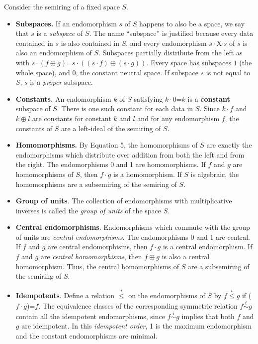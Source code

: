 \documentclass[11pt]{article}
\begin{document}
Consider the semiring of a fixed space $S$.  
\begin{itemize}

\item{{\bf Subspaces.} If an endomorphism $s$ of $S$ happens to also be a space, we say that $s$ is a {\it subspace} of $S$.  The name ``subspace'' is justified because every data contained in $s$ is also contained in $S$, and every endomorphism $s\cdot$X$\cdot s$ of $s$ is also an endomorphism of $S$.  
Subspaces partially distribute from the left as with $s\cdot(f\oplus g)$=$s\cdot((s\cdot f)\oplus(s\cdot g))$.
Every space has subspaces $1$ (the whole space), and $0$, the constant neutral space.  If subspace $s$ is not equal to $S$, $s$ is a {\it proper} subspace.} 

\item{{\bf Constants.}  An endomorphism $k$ of $S$ satisfying $k\cdot 0$=$k$ is a {\bf constant} subspace of $S$.  There is one such constant for each 
data in $S$.  Since $k\cdot f$ and $k\oplus l$ are constants for 
constant $k$ and $l$ and for any endomorphism $f$, the constants of $S$ are a left-ideal of the semiring of $S$.} 

\item{{\bf Homomorphisms.}  By Equation 5, the homomorphisms of $S$ are exactly the endomorphisms which distribute over addition from
both the left and from the right.  The endomorphisms 0 and 1 are homomorphisms.  If $f$ and $g$ are homomorphisms of $S$, then 
$f\cdot g$ is a homomorphism.  If $S$ is algebraic, the homomorphisms are a subsemiring of the semiring of $S$.} 

\item {{\bf Group of units}. The collection of endomorphisms with multiplicative inverses is called the {\it group of units} of the space $S$.} 

\item{{\bf Central endomorphisms}.  Endomorphisms which commute with the group of units are {\it central endomorphisms}.  The endomorphisms 0 and 1 
are central.  If $f$ and $g$ are central endomorphisms, then $f\cdot g$ is a central endomorphism.  If $f$ and $g$ are {\it central homomorphisms}, then 
$f\oplus g$ is also a central homomorphism.  Thus, the central homomorphisms of $S$ are a subsemiring of the semiring of $S$.}

\item{{\bf Idempotents}.  Define a relation ${\overset i \leq}$ on the endomorphisms of $S$ by $f{\overset i \leq}g$ if ($f\cdot g$)=$f$.  The equivalence 
classes of the corresponding symmetric relation $f{\overset i \sim} g$ contain all the idempotent endomorphisms, since $f{\overset i\sim}g$ implies that 
both $f$ and $g$ are idempotent.  In this {\it idempotent order}, 1 is the maximum endomorphism and the constant endomorphisms are minimal.}


\end{itemize}
\end{document}
